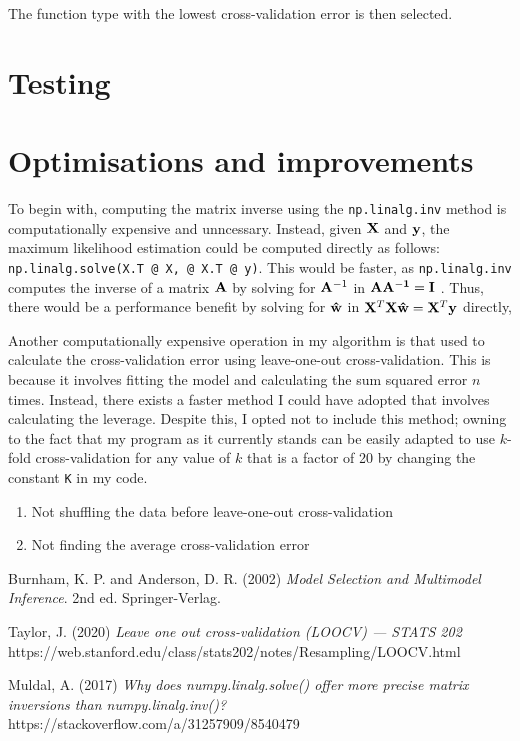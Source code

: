 \documentclass[onecolumn, 11pt, a4paper]{article}
\begin{document}
The function type with the lowest cross-validation error is then selected.

\section{Testing}

\section{Optimisations and improvements}

To begin with,
computing the matrix inverse using the \texttt{np.linalg.inv}
method is computationally expensive and unncessary.
Instead, given $\vb{X}$ and $\vb{y}$, the maximum likelihood
estimation could be computed directly as follows:
\texttt{np.linalg.solve(X.T @ X, @ X.T @ y)}.
This would be faster, as \texttt{np.linalg.inv}
computes the inverse of a matrix $\vb{A}$ by solving for $\vb{A}^{-1}$
in $\vb{AA^{-1} = I}$ \cite{StackOverflow}.
Thus, there would be a performance benefit by solving for
$\vb{\hat{w}}$ in
$\vb{X}^{T} \vb{X} \vb{\hat{w}} = \vb{X}^{T} \vb{y}$ directly,

Another computationally expensive operation in my
algorithm is that used to calculate the cross-validation error 
using leave-one-out cross-validation.
This is because it involves
fitting the model and calculating the sum squared error
$n$ times. 
Instead, there exists a faster method I could have
adopted that involves calculating the leverage.
Despite this, I opted not to include this method; 
owning to the fact that my program as it
currently stands can be easily adapted to use $k$-fold
cross-validation for any value of $k$ that is a factor of 20
by changing the constant \texttt{K} in my code.


\begin{enumerate}
    \item{Not shuffling the data before leave-one-out cross-validation}
    \item{Not finding the average cross-validation error}
\end{enumerate}

\begin{thebibliography}{9}

    Burnham, K. P. and Anderson, D. R. (2002)
    \textit{Model Selection and Multimodel Inference}.
    2nd ed. Springer-Verlag.

    Taylor, J. (2020)
    \textit{Leave one out cross-validation (LOOCV) --- STATS 202}
    https://web.stanford.edu/class/stats202/notes/Resampling/LOOCV.html

    Muldal, A. (2017)
    \textit{Why does numpy.linalg.solve() offer more precise matrix inversions than numpy.linalg.inv()?}
    https://stackoverflow.com/a/31257909/8540479



\end{thebibliography}
    
\end{document}
